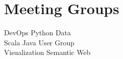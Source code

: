 \documentclass[letterpaper]{deedy-resume} %
\begin{document}
\begin{minipage}[t]{0.33\textwidth}
\section{Meeting Groups}

DevOps \textbullet{} Python \textbullet{} Data \\
Scala \textbullet{} Java User Group \\
Visualization \textbullet{} Semantic Web

\sectionspace %


\end{minipage} %
\hfill
%
%
\end{document}
